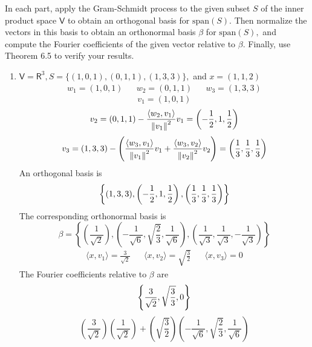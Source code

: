 In each part, apply the Gram-Schmidt process to the given subset $S$
of the inner product space $\mathsf{V}$ to obtain an orthogonal basis
for $\text{span}(S).$ Then normalize the vectors in this basis to
obtain an orthonormal basis $\beta$ for $\text{span}(S),$ and compute
the Fourier coefficients of the given vector relative to $\beta.$
Finally, use Theorem 6.5 to verify your results.
\begin{enumerate}
\item $\mathsf{V} = \mathsf{R}^3, S= \{(1,0,1),(0,1,1),(1,3,3)\},$ and
  $x = (1,1,2)$
\begin{align}
w_1 = (1,0,1) & & w_2 = (0,1,1) & & w_3 = (1,3,3)
\end{align}
\begin{equation}
v_1 = (1,0,1)
\end{equation}
\begin{equation}
v_2 = (0,1,1) - \frac{\langle w_2,v_1 \rangle}{\left\lVert v_1\right\rVert^2}v_1 = \left(-\frac{1}{2},1,\frac{1}{2}\right)
\end{equation}
\begin{equation}
v_3 = (1,3,3) - \left( \frac{\langle w_3,v_1\rangle}{\left\lVert v_1\right\rVert^2}v_1
  +  \frac{\langle w_3,v_2\rangle}{\left\lVert v_2\right\rVert^2}v_2\right) = \left(\frac{1}{3},\frac{1}{3},\frac{1}{3}\right)
\end{equation}
An orthogonal basis is
\begin{equation}
\notag \left\{(1,3,3),\left(-\frac{1}{2},1,\frac{1}{2}\right),\left(\frac{1}{3},\frac{1}{3},\frac{1}{3}\right)\right\}
\end{equation}
The corresponding orthonormal basis is
\begin{equation}
\beta = \left\{\left(\frac{1}{\sqrt{2}}\right),\left(-\frac{1}{\sqrt{6}},\sqrt{\frac{2}{3}},\frac{1}{\sqrt{6}}\right),\left(\frac{1}{\sqrt{3}},\frac{1}{\sqrt{3}},-\frac{1}{\sqrt{3}}\right)\right\}
\end{equation}
\begin{align}
\langle x,v_1\rangle = \frac{3}{\sqrt{2}} & & \langle x,v_2\rangle =
\sqrt{\frac{3}{2}} && \langle x,v_3\rangle = 0
\end{align}
The Fourier coefficients relative to $\beta$ are
\begin{equation}
\notag \left\{\frac{3}{\sqrt{2}},\sqrt{\frac{3}{3}},0\right\}
\end{equation}
\begin{equation}
\left(\frac{3}{\sqrt{2}}\right)\left(\frac{1}{\sqrt{2}}\right) +
\left(\sqrt{\frac{3}{2}}\right)\left(-\frac{1}{\sqrt{6}},\sqrt{\frac{2}{3}},\frac{1}{\sqrt{6}}\right)

\end{equation}
\end{enumerate}
